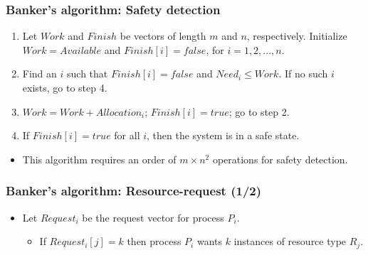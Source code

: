 \documentclass[CJKutf8,xcolor=pdftex,dvipsnames,table]{beamer}
\begin{document}
\begin{CJK*}{UTF8}{song}
  \begin{frame}
  \frametitle{Banker's algorithm: Safety detection} \pause
  \begin{enumerate}
  \item{Let $Work$ and $Finish$ be vectors of length $m$ and $n$, respectively. Initialize $Work = Available$ and $Finish[i] = false$, for $i=1, 2, ..., n$.} \pause
  \item{Find an $i$ such that \pause
      \newline
      $Finish[i] = false$ and $Need_i \leq Work$. \pause
      \newline
      If no such $i$ exists, go to step 4. \pause
    }
  \item{$Work = Work + Allocation_i$; $Finish[i] = true$; \newline go to step 2.} \pause
  \item{If $Finish[i] = true$ for all $i$, then the system is in a safe state.} \pause
  \end{enumerate}
  \begin{itemize}
  \item{This algorithm requires an order of $m \times n^2$ operations for safety detection.}
  \end{itemize}
  \end{frame}

  \begin{frame}
  \frametitle{Banker's algorithm: Resource-request (1/2)} \pause
  \begin{itemize}
  \item{Let $Request_i$ be the request vector for process $P_i$. } \pause
    \begin{itemize}
    \item{If $Request_i[j] = k$ then process $P_i$ wants $k$ instances of resource type $R_j$.}
    \end{itemize}
  \end{itemize}
  \end{frame}


\end{CJK*}
\end{document}
